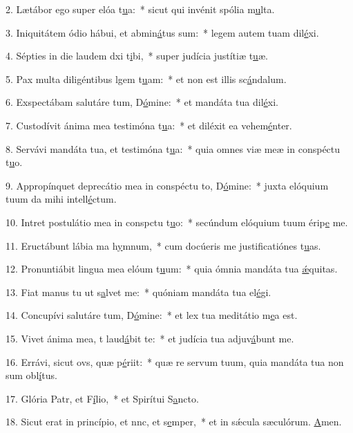 2. Lætábor ego super elóa t\uline{u}a:~* sicut qui invénit spólia m\uline{u}lta.\par 
3. Iniquitátem ódio hábui, et abmin\uline{á}tus sum:~* legem autem tuam dil\uline{é}xi.\par 
4. Sépties in die laudem dxi t\uline{i}bi,~* super judícia justítiæ t\uline{u}æ.\par 
5. Pax multa diligéntibus lgem t\uline{u}am:~* et non est illis sc\uline{á}ndalum.\par 
6. Exspectábam salutáre tum, D\uline{ó}mine:~* et mandáta tua dil\uline{é}xi.\par 
7. Custodívit ánima mea testimóna t\uline{u}a:~* et diléxit ea vehem\uline{é}nter.\par 
8. Servávi mandáta tua, et testimóna t\uline{u}a:~* quia omnes viæ meæ in conspéctu t\uline{u}o.\par 
9. Appropínquet deprecátio mea in conspéctu to, D\uline{ó}mine:~* juxta elóquium tuum da mihi intell\uline{é}ctum.\par 
10. Intret postulátio mea in conspctu t\uline{u}o:~* secúndum elóquium tuum érip\uline{e} me.\par 
11. Eructábunt lábia ma h\uline{y}mnum,~* cum docúeris me justificatiónes t\uline{u}as.\par 
12. Pronuntiábit lingua mea elóum t\uline{u}um:~* quia ómnia mandáta tua \uline{ǽ}quitas.\par 
13. Fiat manus tu ut s\uline{a}lvet me:~* quóniam mandáta tua el\uline{é}gi.\par 
14. Concupívi salutáre tum, D\uline{ó}mine:~* et lex tua meditátio m\uline{e}a est.\par 
15. Vivet ánima mea, t laud\uline{á}bit te:~* et judícia tua adjuv\uline{á}bunt me.\par 
16. Errávi, sicut ovs, quæ p\uline{é}riit:~* quæ re servum tuum, quia mandáta tua non sum obl\uline{í}tus.\par 
17. Glória Patr, et F\uline{í}lio,~* et Spirítui S\uline{a}ncto.\par 
18. Sicut erat in princípio, et nnc, et s\uline{e}mper,~* et in sǽcula sæculórum. \uline{A}men.\par 
